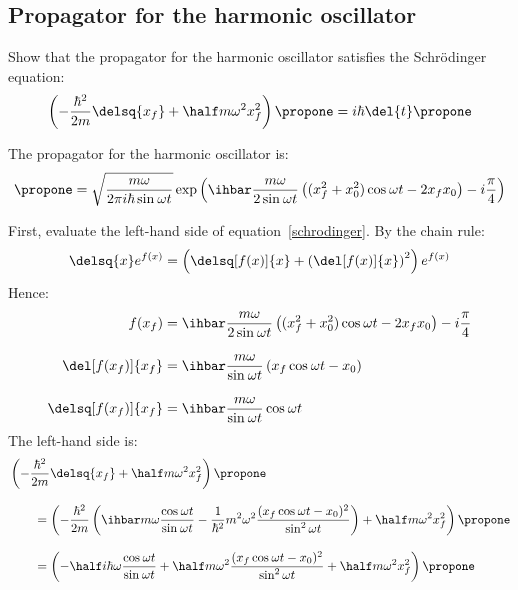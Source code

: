 \newcommand{\w}{\omega}
\newcommand{\sinwt}[1][]{\sin^{#1}\omega t}
\newcommand{\coswt}[1][]{\cos^{#1}\omega t}
\newcommand{\cotwt}[1][]{\cot^{#1}\omega t}
\newcommand{\cscwt}[1][]{\csc^{#1}\omega t}

\subsection{Propagator for the harmonic oscillator}

Show that the propagator for the harmonic oscillator satisfies the
Schr\"{o}dinger equation:
\begin{equation}
  \label{schrodinger}
  \left(-\frac{\hbar^2}{2m}\delsq{x_f} + \half m\w ^2 x_f^2\right) \propone
  =
  i\hbar\del{t}\propone
\end{equation}

The propagator for the harmonic oscillator is:
\begin{equation}
  \label{propagator}
  \propone
  =
  \sqrt{\frac{m\w }{2\pi i\hbar\sinwt}}
  \exp\left(
  \ihbar\frac{m\w }{2\sinwt}\left(
  (x_f^2 + x_0^2)\coswt - 2x_f x_0
  \right) - i\frac{\pi}{4}
  \right)
\end{equation}

First, evaluate the left-hand side of equation~\ref{schrodinger}.
By the chain rule:
\begin{equation*}
  \delsq{x} e^{f(x)}
  =
  \left(\delsq[f(x)]{x} + \left(\del[f(x)]{x}\right)^2\right) e^{f(x)}
\end{equation*}
Hence:
\begin{align*}
  f(x_f)
   & =
  \ihbar\frac{m\w }{2\sinwt}\left(
  (x_f^2 + x_0^2)\coswt - 2x_f x_0
  \right) - i\frac{\pi}{4}
  \\[2ex]
  \del[f(x_f)]{x_f}
   & =
  \ihbar\frac{m\w }{\sinwt}\left(
  x_f\coswt - x_0
  \right)
  \\[2ex]
  \delsq[f(x_f)]{x_f}
   & =
  \ihbar\frac{m\w }{\sinwt}\coswt
\end{align*}
The left-hand side is:
\begin{align}
   & \left(-\frac{\hbar^2}{2m}\delsq{x_f} +
  \half m\w ^2 x_f^2\right) \propone
  \nonumber
  \\[2ex]
   & \qquad =
  \left(
  -\frac{\hbar^2}{2m}\left(
    \ihbar m\w\frac{\coswt}{\sinwt} -
    \frac{1}{\hbar^2}m^2\w ^2 \frac{(x_f \coswt - x_0)^2}{\sinwt[2]}
    \right) +
  \half m\w ^2 x_f^2
  \right)
  \propone
  \nonumber
  \\[2ex]
  \label{lhs}
   & \qquad =
  \left(
  -\half i\hbar\w\frac{\coswt}{\sinwt} +
  \half m\w^2\frac{(x_f \coswt - x_0)^2}{\sinwt[2]} +
  \half m\w ^2 x_f^2
  \right)
  \propone
\end{align}

